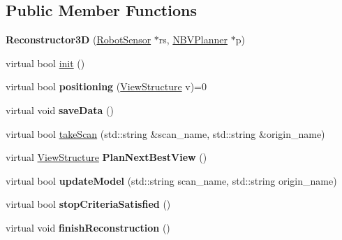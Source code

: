 \subsection*{Public Member Functions}
\begin{DoxyCompactItemize}
\item 
{\bfseries Reconstructor3D} (\hyperlink{classRobotSensor}{Robot\+Sensor} $\ast$rs, \hyperlink{classNBVPlanner}{N\+B\+V\+Planner} $\ast$p)\hypertarget{classReconstructor3D_a6dc91fcadae64d16bf72d98072e109dc}{}\label{classReconstructor3D_a6dc91fcadae64d16bf72d98072e109dc}

\item 
virtual bool \hyperlink{classReconstructor3D_a7ac7a63de2bfa609b1b0d15cde33f139}{init} ()
\item 
virtual bool {\bfseries positioning} (\hyperlink{classViewStructure}{View\+Structure} v)=0\hypertarget{classReconstructor3D_a00be85ea925b48d3e5ec1e773a9c5846}{}\label{classReconstructor3D_a00be85ea925b48d3e5ec1e773a9c5846}

\item 
virtual void {\bfseries save\+Data} ()\hypertarget{classReconstructor3D_a2368a98c5421e08f91881cf2faa8689a}{}\label{classReconstructor3D_a2368a98c5421e08f91881cf2faa8689a}

\item 
virtual bool \hyperlink{classReconstructor3D_ac4433ce176af00bd57a79d67d0fc4a14}{take\+Scan} (std\+::string \&scan\+\_\+name, std\+::string \&origin\+\_\+name)
\item 
virtual \hyperlink{classViewStructure}{View\+Structure} {\bfseries Plan\+Next\+Best\+View} ()\hypertarget{classReconstructor3D_a70ee2a6553cc0e92e15bbf55574aa9f5}{}\label{classReconstructor3D_a70ee2a6553cc0e92e15bbf55574aa9f5}

\item 
virtual bool {\bfseries update\+Model} (std\+::string scan\+\_\+name, std\+::string origin\+\_\+name)\hypertarget{classReconstructor3D_a10279e3dd4100d1a9c334c38e2ed01c9}{}\label{classReconstructor3D_a10279e3dd4100d1a9c334c38e2ed01c9}

\item 
virtual bool {\bfseries stop\+Criteria\+Satisfied} ()\hypertarget{classReconstructor3D_aadea36c1a4989198e092b60a299f8729}{}\label{classReconstructor3D_aadea36c1a4989198e092b60a299f8729}

\item 
virtual void {\bfseries finish\+Reconstruction} ()\hypertarget{classReconstructor3D_a77464b426265ab191b87e32b0160ac52}{}\label{classReconstructor3D_a77464b426265ab191b87e32b0160ac52}


\end{DoxyCompactItemize}
